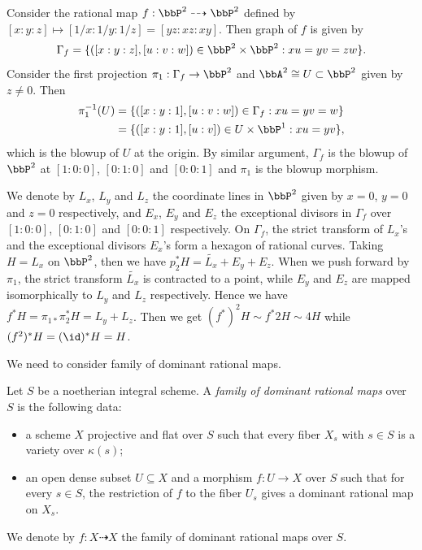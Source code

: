   \begin{example}
    Consider the rational map $f: \bbP^2 \dashrightarrow \bbP^2$ defined by $[x:y:z] \mapsto [1/x:1/y:1/z] = [yz:xz:xy]$.
    Then graph of $f$ is given by 
    \[ \Gamma_f = \{ ([x:y:z], [u:v:w]) \in \bbP^2 \times \bbP^2 : xu = yv = zw \}. \]
    Consider the first projection $\pi_1: \Gamma_f \to \bbP^2$ and $\bbA^2 \cong U \subset \bbP^2$ given by $z \neq 0$.
    Then 
    \begin{align*}
      \pi_1^{-1}(U) & = \{ ([x:y:1], [u:v:w]) \in \Gamma_f : xu = yv = w \} \\
      & = \{ ([x:y:1], [u:v]) \in U \times \bbP^1 : xu = yv \},
    \end{align*} 
    which is the blowup of $U$ at the origin.
    By similar argument, $\Gamma_f$ is the blowup of $\bbP^2$ at $[1:0:0]$, $[0:1:0]$ and $[0:0:1]$ and $\pi_1$ is the blowup morphism.

    We denote by $L_x$, $L_y$ and $L_z$ the coordinate lines in $\bbP^2$ given by $x=0$, $y=0$ and $z=0$ respectively, 
    and $E_x$, $E_y$ and $E_z$ the exceptional divisors in $\Gamma_f$ over $[1:0:0]$, $[0:1:0]$ and $[0:0:1]$ respectively.
    On $\Gamma_f$, the strict transform of $L_x$'s and the exceptional divisors $E_x$'s form a hexagon of rational curves.
    Taking $H = L_x$ on $\bbP^2$, then we have $p_2^* H = \tilde{L_x} + E_y + E_z$.
    When we push forward by $\pi_1$, the strict transform $\tilde{L_x}$ is contracted to a point, while $E_y$ and $E_z$ are mapped isomorphically to $L_y$ and $L_z$ respectively.
    Hence we have $f^* H = \pi_{1*} \pi_2^* H = L_y + L_z$.
    Then we get $(f^*)^2 H \sim f^*2H \sim 4H$ while $(f^2)^*H = (\id)^* H = H$.
  \end{example}

  We need to consider family of dominant rational maps.
  \begin{definition}
    Let $S$ be a noetherian integral scheme.
    A \emph{family of dominant rational maps} over $S$ is the following data:
    \begin{itemize}
      \item a scheme $X$ projective and flat over $S$ such that every fiber $X_s$ with $s \in S$ is a variety over $\kappa(s)$;
      \item an open dense subset $U \subseteq X$ and a morphism $f: U \to X$ over $S$ such that for every $s \in S$, the restriction of $f$ to the fiber $U_s$ gives a dominant rational map on $X_s$.
    \end{itemize}
    We denote by $f: X \dashrightarrow X$ the family of dominant rational maps over $S$.
  \end{definition}

